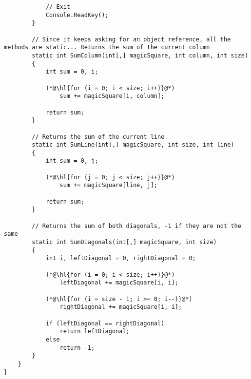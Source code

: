 \documentclass {article}
\begin{document}
\begin{lstlisting}
            // Exit
            Console.ReadKey();
        }

        // Since it keeps asking for an object reference, all the methods are static... Returns the sum of the current column
        static int SumColumn(int[,] magicSquare, int column, int size)
        {
            int sum = 0, i;

            (*@\hl{for (i = 0; i < size; i++)}@*)
                sum += magicSquare[i, column];

            return sum;
        }

        // Returns the sum of the current line
        static int SumLine(int[,] magicSquare, int size, int line)
        {
            int sum = 0, j;

            (*@\hl{for (j = 0; j < size; j++)}@*)
                sum += magicSquare[line, j];

            return sum;
        }

        // Returns the sum of both diagonals, -1 if they are not the same
        static int SumDiagonals(int[,] magicSquare, int size)
        {
            int i, leftDiagonal = 0, rightDiagonal = 0;

            (*@\hl{for (i = 0; i < size; i++)}@*)
                leftDiagonal += magicSquare[i, i];

            (*@\hl{for (i = size - 1; i >= 0; i--)}@*)
                rightDiagonal += magicSquare[i, i];

            if (leftDiagonal == rightDiagonal)
                return leftDiagonal;
            else
                return -1;
        }
    }
}
    \end{lstlisting}
    
\end{document}

